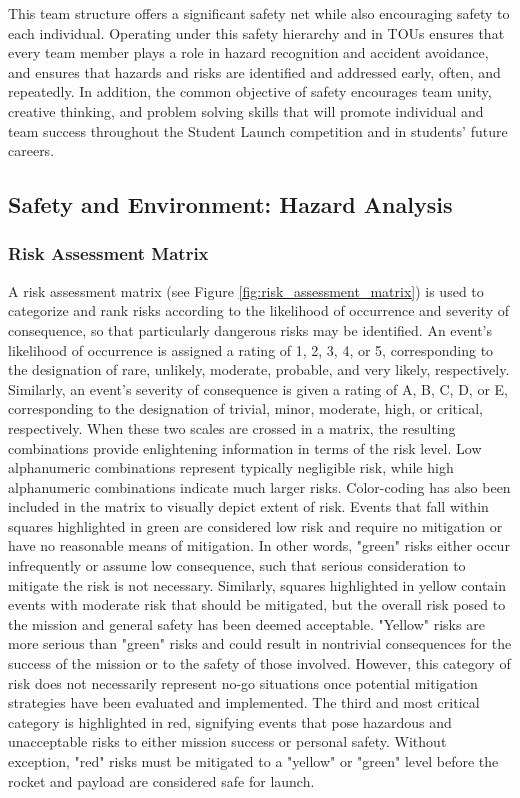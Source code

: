 		This team structure offers a significant safety net while also encouraging safety to each individual. Operating under this safety hierarchy and in TOUs ensures that every team member plays a role in hazard recognition and accident avoidance, and ensures that hazards and risks are identified and addressed early, often, and repeatedly. In addition, the common objective of safety encourages team unity, creative thinking, and problem solving skills that will promote individual and team success throughout the Student Launch competition and in students' future careers. 
	
\bigbreak

		\subsection{Safety and Environment: Hazard Analysis}
		\label{subsec:hazard_analysis}
		\subsubsection{Risk Assessment Matrix}
		\label{subsec:risk_assessment_matrix}
	
	A risk assessment matrix (see Figure \ref{fig:risk_assessment_matrix}) is used to categorize and rank risks according to the likelihood of occurrence and severity of consequence, so that particularly dangerous risks may be identified. An event's likelihood of occurrence is assigned a rating of 1, 2, 3, 4, or 5, corresponding to the designation of rare, unlikely, moderate, probable, and very likely, respectively. Similarly, an event's severity of consequence is given a rating of A, B, C, D, or E, corresponding to the designation of trivial, minor, moderate, high, or critical, respectively. When these two scales are crossed in a matrix, the resulting combinations provide enlightening information in terms of the risk level. Low alphanumeric combinations represent typically negligible risk, while high alphanumeric combinations indicate much larger risks. Color-coding has also been included in the matrix to visually depict extent of risk. Events that fall within squares highlighted in green are considered low risk and require no mitigation or have no reasonable means of mitigation. In other words, "green" risks either occur infrequently or assume low consequence, such that serious consideration to mitigate the risk is not necessary. Similarly, squares highlighted in yellow contain events with moderate risk that should be mitigated, but the overall risk posed to the mission and general safety has been deemed acceptable. "Yellow" risks are more serious than "green" risks and could result in nontrivial consequences for the success of the mission or to the safety of those involved. However, this category of risk does not necessarily represent no-go situations once potential mitigation strategies have been evaluated and implemented. The third and most critical category is highlighted in red, signifying events that pose hazardous and unacceptable risks to either mission success or personal safety. Without exception, "red" risks must be mitigated to a "yellow" or "green" level before the rocket and payload are considered safe for launch.
	
